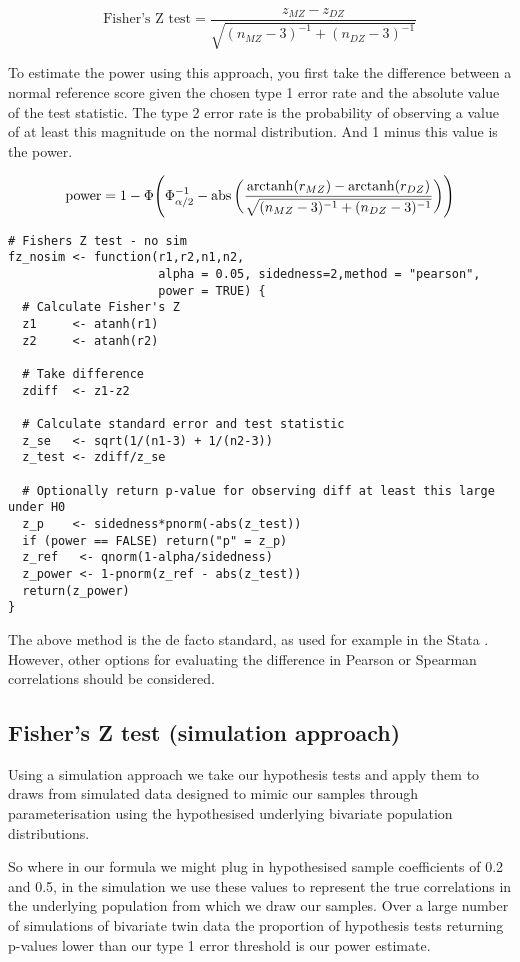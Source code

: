 $$\text{Fisher's Z test} = \frac{z_{MZ} - z_{DZ}}{\sqrt{(n_{MZ}-3)^{-1} + (n_{DZ}-3)^{-1}}}$$
 
To estimate the power using this approach, you first take the difference between a normal reference score given the chosen type 1 error rate and the absolute value of the test statistic. The type 2 error rate is the probability of observing a value of at least this magnitude on the normal distribution.  And 1 minus this value is the power.

$$ \operatorname{power} = 1- \Phi \Bigg(\Phi_{\alpha/2}^{-1} -  \operatorname{abs}\bigg(  \frac{\operatorname{arctanh}(r_{MZ}) - \operatorname{arctanh}(r_{DZ})}{\sqrt{(n_{MZ}-3)^{-1} + (n_{DZ}-3)^{-1}}}  \bigg)  \Bigg) $$ 

\begin{lstlisting}[caption={Fisher's Z test (analytic approach)}]
# Fishers Z test - no sim
fz_nosim <- function(r1,r2,n1,n2,
                     alpha = 0.05, sidedness=2,method = "pearson",
                     power = TRUE) {
  # Calculate Fisher's Z
  z1     <- atanh(r1)
  z2     <- atanh(r2)
  
  # Take difference
  zdiff  <- z1-z2
  
  # Calculate standard error and test statistic
  z_se   <- sqrt(1/(n1-3) + 1/(n2-3))
  z_test <- zdiff/z_se
  
  # Optionally return p-value for observing diff at least this large under H0
  z_p    <- sidedness*pnorm(-abs(z_test))
  if (power == FALSE) return("p" = z_p)
  z_ref   <- qnorm(1-alpha/sidedness)
  z_power <- 1-pnorm(z_ref - abs(z_test))
  return(z_power)
}
\end{lstlisting}

The above method is the de facto standard, as used for example in the Stata .  However, other options for evaluating the difference in Pearson or Spearman correlations should be considered.  
\\
\subsection{Fisher's Z test (simulation approach)}
Using a simulation approach we take our hypothesis tests and apply them to draws from simulated data designed to mimic our samples through parameterisation using the hypothesised underlying bivariate population distributions.  

So where in our formula we might plug in hypothesised sample coefficients of 0.2 and 0.5, in the simulation we use these values to represent the true correlations in the underlying population from which we draw our samples.  Over a large number of simulations of bivariate twin data the proportion of hypothesis tests returning p-values lower than our type 1 error threshold is our power estimate.

